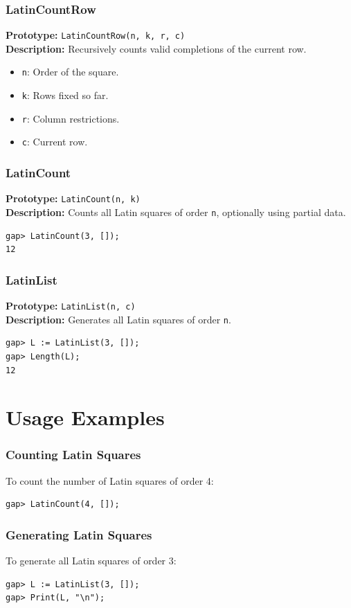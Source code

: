 \documentclass{beamer}
\begin{document}
\begin{frame}[fragile]
\frametitle{LatinCountRow}
\textbf{Prototype:} \texttt{LatinCountRow(n, k, r, c)}\\
\textbf{Description:} Recursively counts valid completions of the current row.
\begin{itemize}
  \item \texttt{n}: Order of the square.
  \item \texttt{k}: Rows fixed so far.
  \item \texttt{r}: Column restrictions.
  \item \texttt{c}: Current row.
\end{itemize}
\end{frame}

\begin{frame}[fragile]
\frametitle{LatinCount}
\textbf{Prototype:} \texttt{LatinCount(n, k)}\\
\textbf{Description:} Counts all Latin squares of order \texttt{n}, optionally using partial data.
\begin{lstlisting}
gap> LatinCount(3, []);
12
\end{lstlisting}
\end{frame}

\begin{frame}[fragile]
\frametitle{LatinList}
\textbf{Prototype:} \texttt{LatinList(n, c)}\\
\textbf{Description:} Generates all Latin squares of order \texttt{n}.
\begin{lstlisting}
gap> L := LatinList(3, []);
gap> Length(L);
12
\end{lstlisting}
\end{frame}

\section{Usage Examples}
\begin{frame}[fragile]
\frametitle{Counting Latin Squares}
To count the number of Latin squares of order 4:
\begin{lstlisting}
gap> LatinCount(4, []);
\end{lstlisting}
\end{frame}

\begin{frame}[fragile]
\frametitle{Generating Latin Squares}
To generate all Latin squares of order 3:
\begin{lstlisting}
gap> L := LatinList(3, []);
gap> Print(L, "\n");
\end{lstlisting}
\end{frame}
\end{document}
